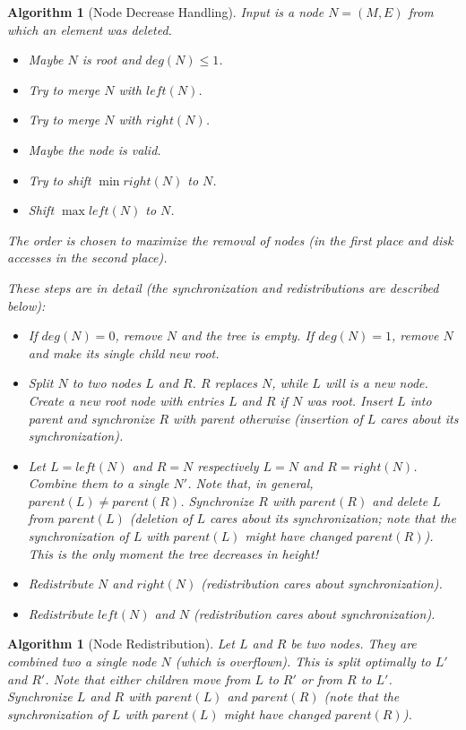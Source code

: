\documentclass[a4paper, 9pt]{scrartcl}
\theoremstyle{plain}
\newtheorem{algo}[thm]{Algorithm}
\theoremstyle{definition}
\theoremstyle{remark}
\begin{document}
\begin{multicols}{2}
\begin{algo}[Node Decrease Handling]
Input is a node \mbox{$N = (M, E)$} from which an element was deleted.
\begin{itemize}
\item[1:] Maybe $N$ is root and \mbox{$deg(N) \leq 1$}.
\item[2:] Try to merge $N$ with $left(N)$.
\item[3:] Try to merge $N$ with $right(N)$.
\item[4:] Maybe the node is valid.
\item[5:] Try to shift \mbox{$\min right(N)$} to $N$.
\item[6:] Shift \mbox{$\max left(N)$} to $N$.
\end{itemize}
The order is chosen to maximize the removal of nodes (in the first place and
disk accesses in the second place).

These steps are in detail (the synchronization and redistributions are 
described below):
\begin{itemize}
\item[ad 1:] If \mbox{$deg(N) = 0$}, remove $N$ and the tree is empty.
	If \mbox{$deg(N) = 1$}, remove $N$ and make its single child new root.
\item[ad 2:] Split $N$ to two nodes $L$ and $R$. $R$ replaces $N$, while
	$L$ will is a new node. Create a new root node with entries $L$ and $R$
	if $N$ was root. Insert $L$ into parent and synchronize $R$ with parent
	otherwise (insertion of $L$ cares about its synchronization).
\item[ad 3+4:] Let \mbox{$L = left(N)$} and \mbox{$R = N$} respectively
	\mbox{$L = N$} and $R = right(N)$.
	Combine them to a single $N'$. Note that, in general,
	\mbox{$parent(L) \neq parent(R)$}. Synchronize $R$ with $parent(R)$ and
	delete $L$ from $parent(L)$ (deletion of $L$ cares about its
	synchronization; note that the synchronization of $L$ with $parent(L)$
	{\em might have changed} $parent(R)$).
	This is the only moment the {\em tree decreases in height}!
\item[ad 5:] Redistribute $N$ and $right(N)$ (redistribution cares about
	synchronization).
\item[ad 6:] Redistribute $left(N)$ and $N$ (redistribution cares about
	synchronization).
\end{itemize}
\end{algo}


\begin{algo}[Node Redistribution]
Let $L$ and $R$ be two nodes. They are combined two a single node $N$
(which is overflown). This is split optimally to $L'$ and $R'$.
Note that either children move from $L$ to $R'$ or from $R$ to $L'$.
Synchronize $L$ and $R$ with $parent(L)$ and $parent(R)$ (note that the
synchronization of $L$ with $parent(L)$ {\em might have changed} $parent(R)$).
\end{algo}



\end{multicols}
\end{document}
